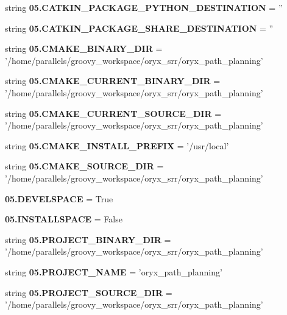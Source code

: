 \begin{DoxyCompactItemize}
\item 
string {\bf 05.\-C\-A\-T\-K\-I\-N\-\_\-\-P\-A\-C\-K\-A\-G\-E\-\_\-\-P\-Y\-T\-H\-O\-N\-\_\-\-D\-E\-S\-T\-I\-N\-A\-T\-I\-O\-N} = ''
\item 
string {\bf 05.\-C\-A\-T\-K\-I\-N\-\_\-\-P\-A\-C\-K\-A\-G\-E\-\_\-\-S\-H\-A\-R\-E\-\_\-\-D\-E\-S\-T\-I\-N\-A\-T\-I\-O\-N} = ''
\item 
string {\bf 05.\-C\-M\-A\-K\-E\-\_\-\-B\-I\-N\-A\-R\-Y\-\_\-\-D\-I\-R} = '/home/parallels/groovy\-\_\-workspace/oryx\-\_\-srr/oryx\-\_\-path\-\_\-planning'
\item 
string {\bf 05.\-C\-M\-A\-K\-E\-\_\-\-C\-U\-R\-R\-E\-N\-T\-\_\-\-B\-I\-N\-A\-R\-Y\-\_\-\-D\-I\-R} = '/home/parallels/groovy\-\_\-workspace/oryx\-\_\-srr/oryx\-\_\-path\-\_\-planning'
\item 
string {\bf 05.\-C\-M\-A\-K\-E\-\_\-\-C\-U\-R\-R\-E\-N\-T\-\_\-\-S\-O\-U\-R\-C\-E\-\_\-\-D\-I\-R} = '/home/parallels/groovy\-\_\-workspace/oryx\-\_\-srr/oryx\-\_\-path\-\_\-planning'
\item 
string {\bf 05.\-C\-M\-A\-K\-E\-\_\-\-I\-N\-S\-T\-A\-L\-L\-\_\-\-P\-R\-E\-F\-I\-X} = '/usr/local'
\item 
string {\bf 05.\-C\-M\-A\-K\-E\-\_\-\-S\-O\-U\-R\-C\-E\-\_\-\-D\-I\-R} = '/home/parallels/groovy\-\_\-workspace/oryx\-\_\-srr/oryx\-\_\-path\-\_\-planning'
\item 
{\bf 05.\-D\-E\-V\-E\-L\-S\-P\-A\-C\-E} = \-True
\item 
{\bf 05.\-I\-N\-S\-T\-A\-L\-L\-S\-P\-A\-C\-E} = \-False
\item 
string {\bf 05.\-P\-R\-O\-J\-E\-C\-T\-\_\-\-B\-I\-N\-A\-R\-Y\-\_\-\-D\-I\-R} = '/home/parallels/groovy\-\_\-workspace/oryx\-\_\-srr/oryx\-\_\-path\-\_\-planning'
\item 
string {\bf 05.\-P\-R\-O\-J\-E\-C\-T\-\_\-\-N\-A\-M\-E} = 'oryx\-\_\-path\-\_\-planning'
\item 
string {\bf 05.\-P\-R\-O\-J\-E\-C\-T\-\_\-\-S\-O\-U\-R\-C\-E\-\_\-\-D\-I\-R} = '/home/parallels/groovy\-\_\-workspace/oryx\-\_\-srr/oryx\-\_\-path\-\_\-planning'
\end{DoxyCompactItemize}
